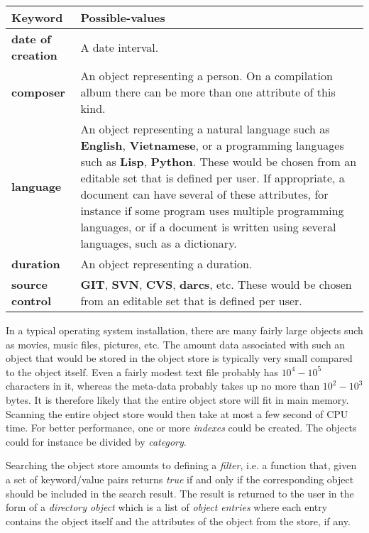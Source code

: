 \begin{tabularx}{\linewidth}%
{|>{\setlength\hsize{.2\hsize}}X|%
  >{\setlength\hsize{.8\hsize}}X|}
\hline
Keyword & Possible-values\\
\hline\hline
\textbf{date of creation} &

A date interval.\\
\hline
\textbf{composer} &

An object representing a person.  On a compilation album there
can be more than one attribute of this kind. \\
\hline
\textbf{language} &

An object representing a natural language such
as \textbf{English}, \textbf{Vietnamese}, or a programming languages
such as \textbf{Lisp}, \textbf{Python}. These would
be chosen from an editable set that is defined per user.  If
appropriate, a document can have several of these attributes, for
instance if some program uses multiple programming languages, or
if a document is written using several languages, such as a
dictionary. \\
\hline
\textbf{duration} &

An object representing a duration. \\
\hline
\textbf{source control} &
 
\textbf{GIT}, \textbf{SVN}, \textbf{CVS}, \textbf{darcs}, etc.  These
would be chosen from an editable set that is defined per user.\\
\hline
\end{tabularx}

In a typical operating system installation, there are many fairly
large objects such as movies, music files, pictures, etc.  The amount
data associated with such an object that would be stored in the object
store is typically very small compared to the object itself.  Even a
fairly modest text file probably has $10^4 - 10^5$ characters in it,
whereas the meta-data probably takes up no more than $10^2 - 10^3$
bytes.  It is therefore likely that the entire object store will fit
in main memory.  Scanning the entire object store would then take at
most a few second of CPU time.  For better performance, one or more
\emph{indexes} could be created.  The objects could for instance be
divided by \emph{category}.

Searching the object store amounts to defining a \emph{filter},
i.e. a function that, given a set of keyword/value pairs returns
\emph{true} if and only if the corresponding object should be included
in the search result.  The result is returned to the user in the form
of a \emph{directory object} which is a list of \emph{object entries}
where each entry contains the object itself and the attributes of the
object from the store, if any.
